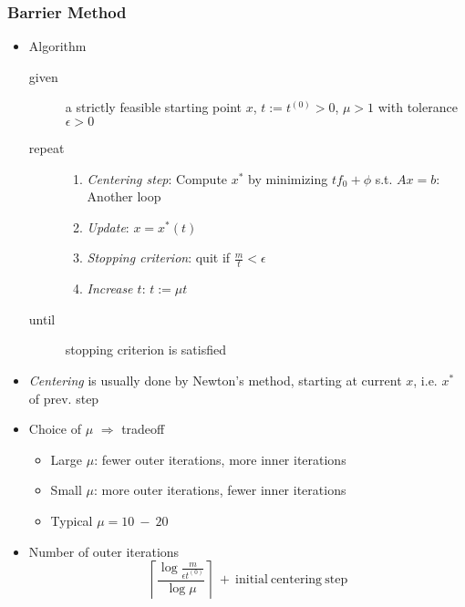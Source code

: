 \subsubsection*{Barrier Method}
\begin{itemize}
    \item Algorithm
    \begin{description}
        \item[given] a strictly feasible starting point $x$, $t:=t^{(0)}>0$, $\mu>1$ with tolerance $\epsilon>0$
        \item[repeat] \phantom{}
        \begin{enumerate}
            \item \textit{Centering step}: Compute $x^\ast$ by minimizing $tf_0+\phi$ s.t. $Ax=b$: Another loop
            \item \textit{Update}: $x=x^\ast(t)$
            \item \textit{Stopping criterion}: quit if $\frac{m}{t}<\epsilon$
            \item \textit{Increase $t$}: $t:=\mu t$
        \end{enumerate}
        \item[until] stopping criterion is satisfied
    \end{description}
    \item \textit{Centering} is usually done by Newton's method, starting at current $x$, i.e. $x^\ast$ of prev. step
    \item Choice of $\mu$ $\Rightarrow$ tradeoff
    \begin{itemize}
        \item Large $\mu$: fewer outer iterations, more inner iterations
        \item Small $\mu$: more outer iterations, fewer inner iterations
        \item Typical $\mu=10~-~20$
    \end{itemize}
    \item Number of outer iterations
        $$ \left\lceil\frac{\log\frac{m}{\epsilon t^{(0)}}}{\log\mu}\right\rceil~+~\mathrm{initial~centering~step} $$
\end{itemize}
